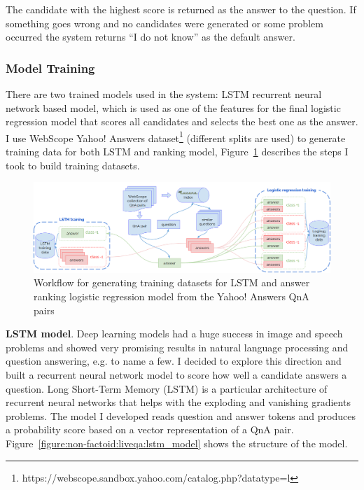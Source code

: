 The candidate with the highest score is returned as the answer to the question.
If something goes wrong and no candidates were generated or some problem occurred the system returns ``I do not know'' as the default answer.

\subsubsection{Model Training}
\label{section:non-factoid:liveqa:architecture:training}

There are two trained models used in the system: LSTM recurrent neural network based model, which is used as one of the features for the final logistic regression model that scores all candidates and selects the best one as the answer.
I use WebScope Yahoo! Answers dataset\footnote{https://webscope.sandbox.yahoo.com/catalog.php?datatype=l} (different splits are used) to generate training data for both LSTM and ranking model, Figure~\ref{figure:non-factoid:liveqa:model_training} describes the steps I took to build training datasets.

\begin{figure}
	\includegraphics[width=470px]{img/liveqa_model_training}
	\caption{Workflow for generating training datasets for LSTM and answer ranking logistic regression model from the Yahoo! Answers QnA pairs}
	\label{figure:non-factoid:liveqa:model_training}
\end{figure}

\textbf{LSTM model}.
Deep learning models had a huge success in image and speech problems and showed very promising results in natural language processing and question answering, e.g. \cite{yu2014deep,diwang_lstm_2015} to name a few.
I decided to explore this direction and built a recurrent neural network model to score how well a candidate answers a question.
Long Short-Term Memory (LSTM) \cite{hochreiter1997long} is a particular architecture of recurrent neural networks that helps with the exploding and vanishing gradients problems.
The model I developed reads question and answer tokens and produces a probability score based on a vector representation of a QnA pair.
Figure~\ref{figure:non-factoid:liveqa:lstm_model} shows the structure of the model.

